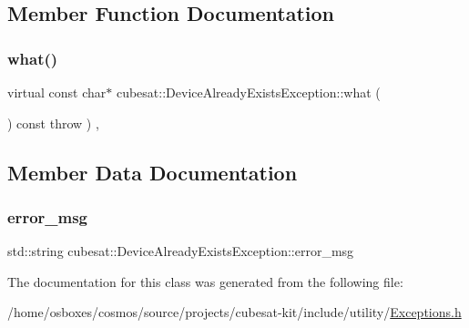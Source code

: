 \subsection{Member Function Documentation}
\mbox{\label{classcubesat_1_1DeviceAlreadyExistsException_a414ac8b05f5219189998541c0e8c15c0}} 
\subsubsection{\texorpdfstring{what()}{what()}}
{\footnotesize\ttfamily virtual const char$\ast$ cubesat\+::\+Device\+Already\+Exists\+Exception\+::what (\begin{DoxyParamCaption}{ }\end{DoxyParamCaption}) const throw  ) \hspace{0.3cm}{\ttfamily [inline]}, {\ttfamily [virtual]}}



\subsection{Member Data Documentation}
\mbox{\label{classcubesat_1_1DeviceAlreadyExistsException_a23f9b3de4f6d97af9997336d61f06f31}} 
\subsubsection{\texorpdfstring{error\+\_\+msg}{error\_msg}}
{\footnotesize\ttfamily std\+::string cubesat\+::\+Device\+Already\+Exists\+Exception\+::error\+\_\+msg\hspace{0.3cm}{\ttfamily [private]}}



The documentation for this class was generated from the following file\+:\begin{DoxyCompactItemize}
\item 
/home/osboxes/cosmos/source/projects/cubesat-\/kit/include/utility/\hyperlink{Exceptions_8h}{Exceptions.\+h}\end{DoxyCompactItemize}
